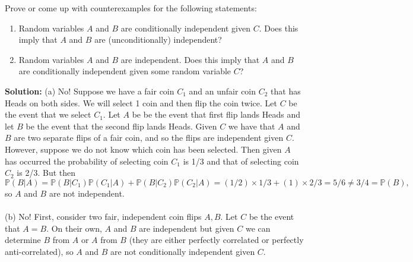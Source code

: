 \documentclass{harvardml}
\theoremstyle{definition}
\theoremstyle{plain}
\begin{document}
\begin{problem}
Prove or come up with counterexamples for the following statements:
    \begin{enumerate}[label=(\alph*)]
        \item  Random variables $A$ and $B$ are conditionally independent given $C$.  Does this imply that $A$ and $B$ are (unconditionally) independent?
        \item  Random variables $A$ and $B$ are independent.  Does this imply that $A$ and $B$ are conditionally independent given some random variable $C$?
    \end{enumerate}

\noindent \textbf{Solution:} 
(a) No! Suppose we have a fair coin $C_1$ and an unfair coin $C_2$ that has Heads on both sides. We will select 1 coin and then flip the coin twice. Let $C$ be the event that we select $C_1$. Let $A$ be be the event that first flip lands Heads and let $B$ be the event that the second flip lands Heads. Given $C$ we have that $A$ and $B$ are two separate flips of a fair coin, and so the flips are independent given $C$. However, suppose we do not know which coin has been selected. Then given $A$ has occurred the probability of selecting coin $C_1$ is 1/3 and that of selecting coin $C_2$ is 2/3. But then $\mathbb P(B|A) = \mathbb P(B|C_1)\mathbb P(C_1|A) + \mathbb P(B|C_2)\mathbb P(C_2|A) = (1/2)\times 1/3 + (1)\times 2/3 = 5/6 \neq 3/4 = \mathbb P(B),$ so $A$ and $B$ are not independent.
\\
\\
(b) No! First, consider two fair, independent coin flips $A, B$. Let $C$ be the event that $A=B$. On their own, $A$ and $B$ are independent but given $C$ we can determine $B$ from $A$ or $A$ from $B$ (they are either perfectly correlated or perfectly anti-correlated), so $A$ and $B$ are not conditionally independent given $C$.
\end{problem}
		   
\end{document}
